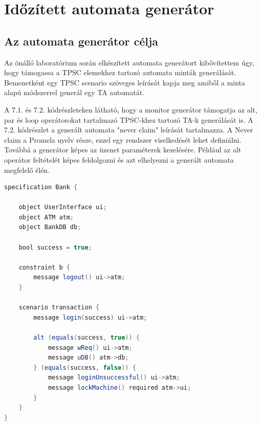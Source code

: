 \chapter{Időzített automata generátor}

\section{Az automata generátor célja}

Az önálló laboratórium során elkészített automata generátort kibővítettem úgy, hogy támogassa a TPSC elemekhez tartozó automata minták generálását. Bemenetként egy TPSC scenario szöveges leírását kapja meg amiből a minta alapú módszerrel generál egy TA automatát.

A 7.1. és 7.2. kódrészleteken látható, hogy a monitor generátor támogatja az alt, par és loop operátorokat tartalmazó TPSC-khez tartozó TA-k generálását is.
A 7.2. kódrészlet a generált automata "never claim" leírását tartalmazza.
A Never claim a Promela nyelv része, ezzel egy rendszer viselkedését lehet definiálni.
Továbbá a generátor képes az üzenet paraméterek kezelésére.
Például az alt operátor feltételét képes feldolgozni és azt elhelyezni a generált automata megfelelő élén.

\begin{lstlisting}[language=java,frame=single, float=h!, caption={Alt operátort tartalmazó scenario.},captionpos=b]
specification Bank {

	object UserInterface ui;
	object ATM atm;
	object BankDB db;

	bool success = true;

	constraint b {
		message logout() ui->atm;
	}

	scenario transaction {
		message login(success) ui->atm;

		alt (equals(success, true)) {
			message wReq() ui->atm;
			message uDB() atm->db;
		} (equals(success, false)) {
			message loginUnsuccessful() ui->atm;
			message lockMachine() required atm->ui;
		}
	}
}
\end{lstlisting}

